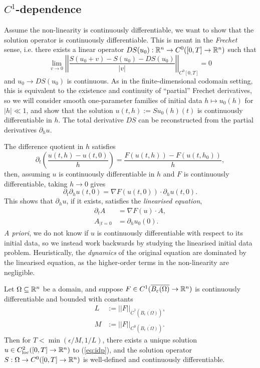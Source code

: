 \subsection{$C^1$-dependence}

Assume the non-linearity is continuously differentiable, we want to show that the solution operator is continuously differentiable. This is meant in the \textit{Frechet} sense, i.e. there exists a linear operator $DS(u_0) : \mathbb R^n \to C^0 ([0, T] \to \mathbb R^n)$ such that 
	\[ \lim_{v \to 0}\left|\left| \frac{S(u_0 + v) - S(u_0) - DS(u_0)}{|v|} \right|\right|_{C^0[0, T]} = 0 \]
and $u_0 \to DS(u_0)$ is continuous. As in the finite-dimensional codomain setting, this is equivalent to the existence and continuity of ``partial'' Frechet derivatives, so we will consider smooth one-parameter families of initial data $h \mapsto u_0 (h)$ for $|h| \ll 1$, and show that the solution $u(t, h) := Su_0 (h) (t)$ is continuously differentiable in $h$. The total derivative $DS$ can be reconstructed from the partial derivatives $\partial_h u$.

 The difference quotient in $h$ satisfies 
	\[ \partial_t \left( \frac{u(t, h) - u(t, 0)}{h} \right) = \frac{F(u(t, h)) - F(u (t, h_0))}{h},  \]
then, assuming $u$ is continuously differentiable in $h$ and $F$ is continuously differentiable, taking $h \to 0$ gives
	\[ \partial_t \partial_h u (t, 0) = \nabla F(u(t, 0)) \cdot \partial_h u (t, 0). \]
This shows that $\partial_h u$, if it exists, satisfies the \emph{linearised equation},
	\begin{equation}
		\begin{split}
			\partial_t A 
		 	&= \nabla F (u) \cdot A,\\
		 A_{|t = 0}
		 	&= \partial_h u_0 (0)	.
		\end{split}
		\tag{Lin}
		\label{eq:linear}
		\end{equation}
\textit{A priori}, we do not know if $u$ is continuously differentiable with respect to its initial data, so we instead work backwards by studying the linearised initial data problem. Heuristically, the \textit{dynamics} of the original equation are dominated by the linearised equation, as the higher-order terms in the non-linearity are negligible. 


\begin{theorem}
	Let $\Omega \subseteq \mathbb R^n$ be a domain, and suppose $F \in C^{1}(\overline{B_\varepsilon (\Omega)} \to \mathbb R^n)$ is continuously differentiable and bounded with constants
		\begin{align*}
			L &:= ||F||_{\dot C^{1} (\overline{B_\epsilon (\Omega)})}, \\
			M &:= ||F||_{C^{0} (\overline{B_\epsilon (\Omega)})}.
		\end{align*}
	Then for $T< \min (\epsilon/M, 1/L)$, there exists a unique solution $u \in C^2_{\mathrm{loc}} ([0, T] \to \mathbb R^n)$ to (\ref{eq:idp}), and the solution operator $S : \Omega \to C^0 ([0, T] \to \mathbb R^n)$	 is well-defined and continuously differentiable.
\end{theorem}

